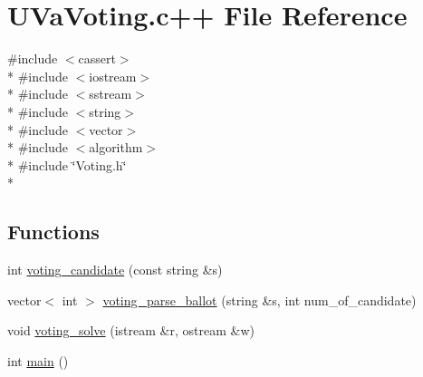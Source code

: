\hypertarget{UVaVoting_8c_09_09}{\section{U\-Va\-Voting.\-c++ File Reference}
\label{UVaVoting_8c_09_09}
}
{\ttfamily \#include $<$cassert$>$}\\*
{\ttfamily \#include $<$iostream$>$}\\*
{\ttfamily \#include $<$sstream$>$}\\*
{\ttfamily \#include $<$string$>$}\\*
{\ttfamily \#include $<$vector$>$}\\*
{\ttfamily \#include $<$algorithm$>$}\\*
{\ttfamily \#include \char`\"{}Voting.\-h\char`\"{}}\\*
\subsection*{Functions}
\begin{DoxyCompactItemize}
\item 
int \hyperlink{UVaVoting_8c_09_09_ad514f6616c181c70aedb499941f2f1c1}{voting\-\_\-candidate} (const string \&s)
\item 
vector$<$ int $>$ \hyperlink{UVaVoting_8c_09_09_a3c01d376b869575ba567bf7b31cd3448}{voting\-\_\-parse\-\_\-ballot} (string \&s, int num\-\_\-of\-\_\-candidate)
\item 
void \hyperlink{UVaVoting_8c_09_09_aed21eca169108fbf5b77db1e7e21af2e}{voting\-\_\-solve} (istream \&r, ostream \&w)
\item 
int \hyperlink{UVaVoting_8c_09_09_ae66f6b31b5ad750f1fe042a706a4e3d4}{main} ()
\end{DoxyCompactItemize}


